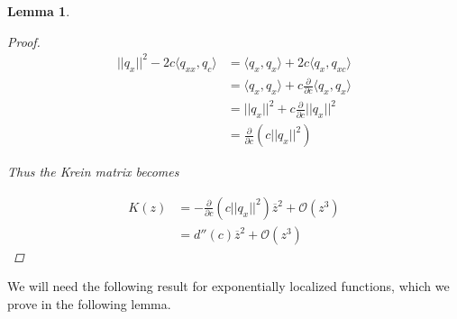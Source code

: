 \documentclass[12pt]{article}
\newtheorem{lemma}{Lemma}
\begin{document}
\begin{lemma}
\begin{proof}
\begin{align*}
||q_x||^2 - 2c \langle q_{xx}, q_c \rangle &= \langle q_x, q_x \rangle + 2c \langle q_{x}, q_{xc} \rangle  \\
&= \langle q_x, q_x \rangle + c \frac{\partial}{\partial c}\langle q_x, q_x \rangle \\
&= ||q_x||^2 + c \frac{\partial}{\partial c}||q_x||^2 \\
&= \frac{\partial}{\partial c} \left( c||q_x||^2 \right)
\end{align*}

Thus the Krein matrix becomes 

\begin{align*}
K(z) &= -\frac{\partial}{\partial c} \left( c||q_x||^2 \right) \overline{z}^2 + \mathcal{O}(z^3) \\
&= d''(c) \overline{z}^2 + \mathcal{O}(z^3)
\end{align*}

\end{proof}
\end{lemma}

We will need the following result for exponentially localized functions, which we prove in the following lemma.
\end{document}
